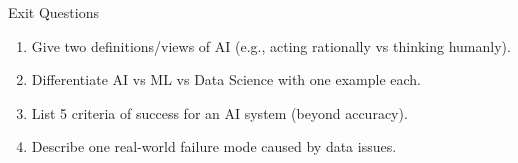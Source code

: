 \documentclass[aspectratio=169]{beamer}
\begin{document}
\begin{frame}{Exit Questions}
  \begin{enumerate}
    \item Give two definitions/views of AI (e.g., acting rationally vs thinking humanly).
    \item Differentiate AI vs ML vs Data Science with one example each.
    \item List 5 criteria of success for an AI system (beyond accuracy).
    \item Describe one real-world failure mode caused by data issues.
  \end{enumerate}
\end{frame}
\end{document}
